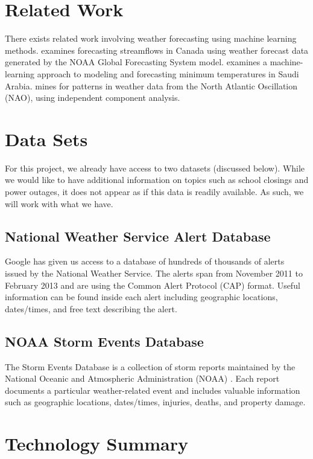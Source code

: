 \documentclass{article}
\begin{document}
\section{Related Work}
\label{related}
There exists related work involving weather forecasting using machine learning methods. \cite{Rasouli2012284} examines forecasting streamflows in Canada using weather forecast data generated by the NOAA Global Forecasting System model. \cite{AbdelAal1994739} examines a machine-learning approach to modeling and forecasting minimum temperatures in Saudi Arabia. \cite{Basak:2004:WDM:1005332.1005341} mines for patterns in weather data from the North Atlantic Oscillation (NAO), using independent component analysis.

\section{Data Sets}
\label{datasets}

For this project, we already have access to two datasets (discussed below). While we would like to have additional information on topics such as school closings and power outages, it does not appear as if this data is readily available. As such, we will work with what we have.

\subsection{National Weather Service Alert Database}
Google has given us access to a database of hundreds of thousands of alerts issued by the National Weather Service. The alerts span from November 2011 to February 2013 and are using the Common Alert Protocol (CAP) format. Useful information can be found inside each alert including geographic locations, dates/times, and free text describing the alert.

\subsection{NOAA Storm Events Database}

The Storm Events Database is a collection of storm reports maintained by the National Oceanic and Atmospheric Administration (NOAA) \cite{stormevents}. Each report documents a particular weather-related event and includes valuable information such as geographic locations, dates/times, injuries, deaths, and property damage.

\section{Technology Summary}
\label{technologysummary}
\end{document}
